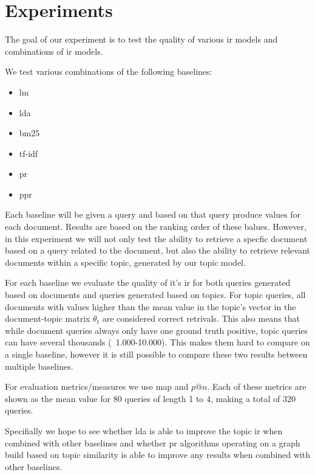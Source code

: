 \section{Experiments}\label{sec:experiment}

The goal of our experiment is to test the quality of various \gls{ir} models and combinations of \gls{ir} models.

We test various combinations of the following baselines:
\begin{itemize}
	\item \gls{lm}
	\item \gls{lda}
	\item \gls{bm25}
	\item \gls{tf-idf}
	\item \gls{pr}
	\item \gls{ppr}
\end{itemize}

Each baseline will be given a query and based on that query produce values for each document. Results are based on the ranking order of these balues.
However, in this experiment we will not only test the ability to retrieve a specfic document based on a query related to the document, but also the ability to retrieve relevant documents within a specific topic, generated by our topic model.

For each baseline we evaluate the quality of it's \gls{ir} for both queries generated based on documents and queries generated based on topics.
For topic queries, all documents with values higher than the mean value in the topic's vector in the document-topic matrix $\theta_t$ are considered correct retrivals.
This also means that while document queries always only have one ground truth positive, topic queries can have several thousands (~1.000-10.000).
This makes them hard to compare on a single baseline, however it is still possible to compare these two results between multiple baselines.

For evaluation metrics/measures we use \gls{map} and $p @ n$.
Each of these metrics are shown as the mean value for 80 queries of length 1 to 4, making a total of 320 queries.

Specifially we hope to see whether \gls{lda} is able to improve the topic \gls{ir} when combined with other baselines and whether \gls{pr} algorithms operating on a graph build based on topic similarity is able to improve any results when combined with other baselines.

